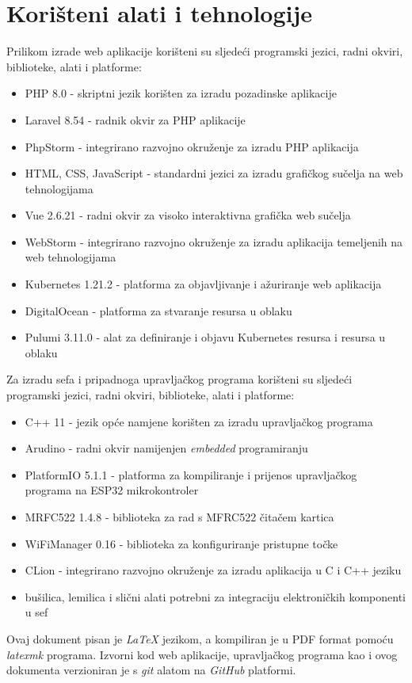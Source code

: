 \chapter{Korišteni alati i tehnologije}

Prilikom izrade web aplikacije korišteni su sljedeći programski jezici, radni okviri, biblioteke, alati i platforme:

\begin{itemize}
    \item PHP 8.0 - skriptni jezik korišten za izradu pozadinske aplikacije
    \item Laravel 8.54 - radnik okvir za PHP aplikacije
    \item PhpStorm - integrirano razvojno okruženje za izradu PHP aplikacija
    \item HTML, CSS, JavaScript - standardni jezici za izradu grafičkog sučelja na web tehnologijama
    \item Vue 2.6.21 - radni okvir za visoko interaktivna grafička web sučelja
    \item WebStorm - integrirano razvojno okruženje za izradu aplikacija temeljenih na web tehnologijama
    \item Kubernetes 1.21.2 - platforma za objavljivanje i ažuriranje web aplikacija
    \item DigitalOcean - platforma za stvaranje resursa u oblaku
    \item Pulumi 3.11.0 - alat za definiranje i objavu Kubernetes resursa i resursa u oblaku
\end{itemize}

Za izradu sefa i pripadnoga upravljačkog programa korišteni su sljedeći programski jezici, radni okviri, biblioteke,
alati i platforme:

\begin{itemize}
    \item C++ 11 - jezik opće namjene korišten za izradu upravljačkog programa
    \item Arudino - radni okvir namijenjen \textit{embedded} programiranju
    \item PlatformIO 5.1.1 - platforma za kompiliranje i prijenos upravljačkog programa na ESP32 mikrokontroler
    \item MRFC522 1.4.8 - biblioteka za rad s MFRC522 čitačem kartica
    \item WiFiManager 0.16 - biblioteka za konfiguriranje pristupne točke
    \item CLion - integrirano razvojno okruženje za izradu aplikacija u C i C++ jeziku
    \item bušilica, lemilica i slični alati potrebni za integraciju elektroničkih komponenti u sef
\end{itemize}

Ovaj dokument pisan je \textit{LaTeX} jezikom, a kompiliran je u PDF format pomoću \textit{latexmk} programa.
Izvorni kod web aplikacije, upravljačkog programa kao i ovog dokumenta verzioniran je s \textit{git} alatom na
\textit{GitHub} platformi.

